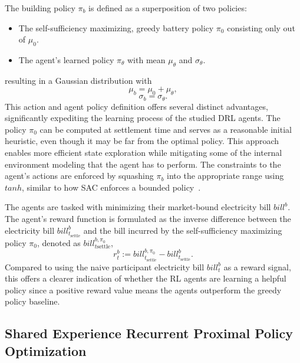 \documentclass[preprint, 12pt]{elsarticle}
\newcommand{\stl}{\text{settle}}
\newcommand{\bill}{\textit{bill}}
\begin{document}
The building policy $\pi_{b}$ is defined as a superposition of two policies: 
\begin{itemize}
    \item The self-sufficiency maximizing, greedy battery policy $\pi_{0}$ consisting only out of $\mu_{0}$.
    \item The agent's learned policy $\pi_{\theta}$ with mean $\mu_{\theta}$ and $\sigma_{\theta}$.
\end{itemize}
resulting in a Gaussian distribution with 
\begin{equation}
    \label{eq:AgentCompositeAction}
    \mu_{b} = \mu_{0} + \mu_{\theta},
\end{equation}
\begin{equation}
    \label{eq:AgentCompositeAction2}
    \sigma_{b} = \sigma_{\theta}.
\end{equation}
This action and agent policy definition offers several distinct advantages, significantly expediting the learning process of the studied DRL agents. The policy $\pi_{0}$ can be computed at settlement time and serves as a reasonable initial heuristic, even though it may be far from the optimal policy. This approach enables more efficient state exploration while mitigating some of the internal environment modeling that the agent has to perform. The constraints to the agent's actions are enforced by squashing $\pi_{b}$ into the appropriate range using $tanh$, similar to how SAC enforces a bounded policy~\cite{SAC}.

The agents are tasked with minimizing their market-bound electricity bill $\bill^{b}$.
The agent's reward function is formulated as the inverse difference between the electricity bill $\bill^{b}_{t_{\stl}}$ and the bill incurred by the self-sufficiency maximizing policy $\pi_{0}$, denoted as $\bill^{b, \pi_{0}}_{t{\stl}}$,  
\begin{equation}
    \label{eq:CompositeBillAdvantage}
    r^{b}_{t}  :=  \bill^{b, \pi_{0}}_{t_{\stl}} - \bill^{b}_{t_{\stl}}.
\end{equation}
Compared to using the naive participant electricity bill $\bill^{b}_{t}$ as a reward signal, this offers a clearer indication of whether the RL agents are learning a helpful policy since a positive reward value means the agents outperform the greedy policy baseline.

\subsection{Shared Experience Recurrent Proximal Policy Optimization}\label{subsec: Algorithm}
\end{document}
